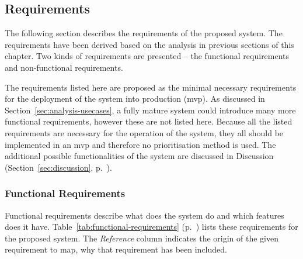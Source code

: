 \subsection{Requirements} \label{sec:analysis-requirements}
The following section describes the requirements of the proposed system. The requirements have been derived based on the analysis in previous sections of this chapter. Two kinds of requirements are presented -- the functional requirements and non-functional requirements. 

The requirements listed here are proposed as the minimal necessary requirements for the deployment of the system into production (\acrlong{mvp}). As discussed in Section~\ref{sec:analysis-usecases}, a fully mature system could introduce many more functional requirements, however these are not listed here. Because all the listed requirements are necessary for the operation of the system, they all should be implemented in an \acrshort{mvp} and therefore no prioritisation method is used. The additional possible functionalities of the system are discussed in Discussion (Section~\ref{sec:discussion}, p.~\pageref{sec:discussion}).

\subsubsection{Functional Requirements} \label{sec:analysis-functionalReqruiements}
Functional requirements describe what does the system do and which features does it have. Table~\ref{tab:functional-requirements} (p.~\pageref{tab:functional-requirements}) lists these requirements for the proposed system. The \textit{Reference} column indicates the origin of the given requirement to map, why that requirement has been included.